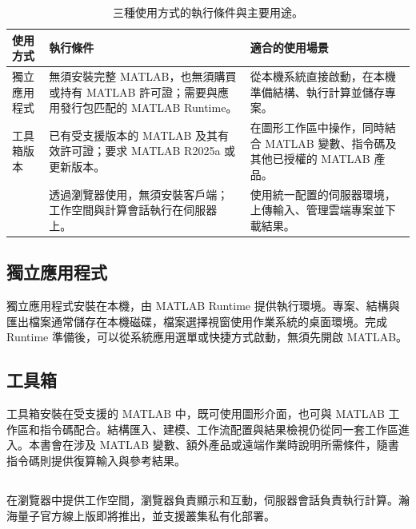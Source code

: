\begin{table}[!htb]
\centering
\caption{三種使用方式的執行條件與主要用途。}
\label{tab:usage-modes}
\begin{tabularx}{\linewidth}{>{\RaggedRight\arraybackslash}p{28mm}>{\RaggedRight\arraybackslash}X>{\RaggedRight\arraybackslash}X}
\toprule
使用方式 & 執行條件 & 適合的使用場景 \\
\midrule
獨立應用程式 & 無須安裝完整 MATLAB\regmark{}，也無須購買或持有 MATLAB\regmark{} 許可證；需要與應用發行包匹配的 MATLAB\regmark{} Runtime。 & 從本機系統直接啟動，在本機準備結構、執行計算並儲存專案。 \\
工具箱版本 & 已有受支援版本的 MATLAB\regmark{} 及其有效許可證；要求 MATLAB\regmark{} R2025a 或更新版本。 & 在圖形工作區中操作，同時結合 MATLAB\regmark{} 變數、指令碼及其他已授權的 MATLAB\regmark{} 產品。 \\
\ksonline{} & 透過瀏覽器使用，無須安裝客戶端；工作空間與計算會話執行在伺服器上。 & 使用統一配置的伺服器環境，上傳輸入、管理雲端專案並下載結果。 \\
\bottomrule
\end{tabularx}
\end{table}

\subsection{獨立應用程式}
獨立應用程式安裝在本機，由 MATLAB\regmark{} Runtime 提供執行環境。專案、結構與匯出檔案通常儲存在本機磁碟，檔案選擇視窗使用作業系統的桌面環境。完成 Runtime 準備後，可以從系統應用選單或快捷方式啟動，無須先開啟 MATLAB\regmark{}。

\subsection{\regmark{} 工具箱}
工具箱安裝在受支援的 MATLAB\regmark{} 中，既可使用圖形介面，也可與 MATLAB\regmark{} 工作區和指令碼配合。結構匯入、建模、工作流配置與結果檢視仍從同一套工作區進入。本書會在涉及 MATLAB\regmark{} 變數、額外產品或遠端作業時說明所需條件，隨書指令碼則提供復算輸入與參考結果。

\subsection{\headinglatin{\ksonline}}
\ksonline{} 在瀏覽器中提供工作空間，瀏覽器負責顯示和互動，伺服器會話負責執行計算。瀚海量子\regmark{}官方線上版即將推出，並支援叢集私有化部署。


